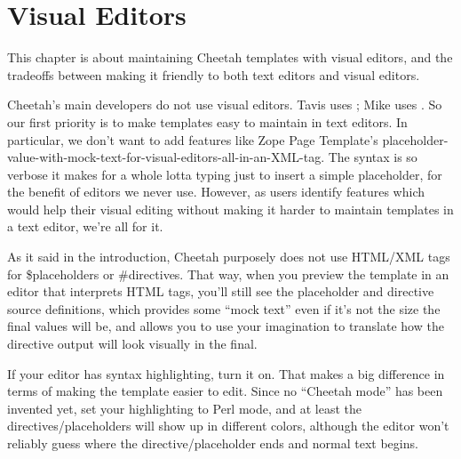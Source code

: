 \section{Visual Editors}
\label{visualEditors}

This chapter is about maintaining Cheetah templates with visual editors,
and the tradeoffs between making it friendly to both text editors and visual
editors.

Cheetah's main developers do not use visual editors.  Tavis uses ;
Mike uses .  So our first priority is to make templates easy to
maintain in text editors.  In particular, we don't want to add features
like Zope Page Template's 
placeholder-value-with-mock-text-for-visual-editors-all-in-an-XML-tag.
The syntax is so verbose it makes for a whole lotta typing just to insert a
simple placeholder, for the benefit of editors we never use.  However, as users
identify features which would help their visual editing without making it
harder to maintain templates in a text editor, we're all for it.  

As it said in the introduction, Cheetah purposely does not use HTML/XML
tags for \$placeholders or \#directives.  That way, when you preview the
template in an editor that interprets HTML tags, you'll still see the
placeholder and directive source definitions, which provides some ``mock text''
even if it's not the size the final values will be, and allows you to use
your imagination to translate how the directive output will look visually in
the final.

If your editor has syntax highlighting, turn it on.  That makes a big 
difference in terms of making the template easier to edit.  Since no
``Cheetah mode'' has been invented yet, set your highlighting to Perl
mode, and at least the directives/placeholders will show up in different
colors, although the editor won't reliably guess where the 
directive/placeholder ends and normal text begins.






